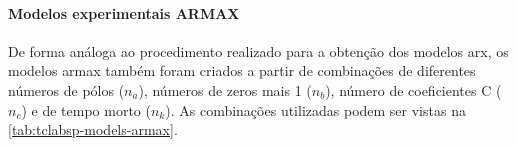 \paragraph*{\textbf{Modelos experimentais ARMAX}}
\label{par:modelos_experimentais_armax}

De forma análoga ao procedimento realizado para a obtenção dos modelos \acrshort{arx}, os modelos
\acrshort{armax} também foram criados a partir de combinações de diferentes números de pólos ($n_a$),
números de zeros mais 1 ($n_b$), número de coeficientes C ($n_c$) e de tempo morto ($n_k$).
As combinações utilizadas podem ser vistas na \cref{tab:tclabsp-models-armax}.

